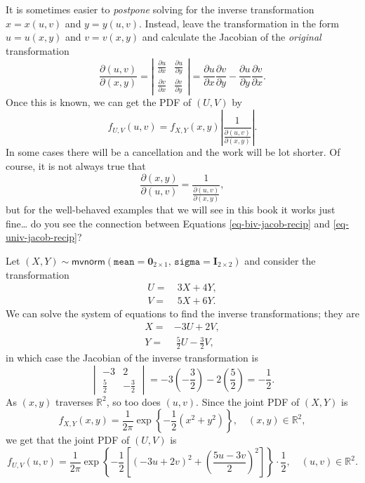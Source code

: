 \begin{rem}
It is sometimes easier to \emph{postpone} solving for the inverse
transformation \(x=x(u,v)\) and \(y=y(u,v)\). Instead, leave the
transformation in the form \(u=u(x,y)\) and \(v=v(x,y)\) and calculate
the Jacobian of the \emph{original} transformation
\begin{equation}
\frac{\partial(u,v)}{\partial(x,y)}=\left|\begin{array}{cc}
\frac{\partial u}{\partial x} & \frac{\partial u}{\partial y}\\
\frac{\partial v}{\partial x} & \frac{\partial v}{\partial y}\end{array}\right|=\frac{\partial u}{\partial x}\frac{\partial v}{\partial y}-\frac{\partial u}{\partial y}\frac{\partial v}{\partial x}.
\end{equation}
Once this is known, we can get the PDF of \((U,V)\) by
\begin{equation}
f_{U,V}(u,v)=f_{X,Y}(x,y)\left|\frac{1}{\frac{\partial(u,v)}{\partial(x,y)}}\right|.
\end{equation}
In some cases there will be a cancellation and the work will be lot
shorter. Of course, it is not always true that
\begin{equation}
\label{eq-biv-jacob-recip}
\frac{\partial(x,y)}{\partial(u,v)}=\frac{1}{\frac{\partial(u,v)}{\partial(x,y)}},
\end{equation}
but for the well-behaved examples that we will see in this book it
works just fine\ldots{} do you see the connection between Equations
\eqref{eq-biv-jacob-recip} and \eqref{eq-univ-jacob-recip}?
\end{rem}



Let
\((X,Y)\sim\mathsf{mvnorm}(\mathtt{mean}=\mathbf{0}_{2\times1},\,\mathtt{sigma}=\mathbf{I}_{2\times2})\)
and consider the transformation
\begin{align*}
U= & \ 3X+4Y,\\
V= & \ 5X+6Y.
\end{align*}
We can solve the system of equations to find the inverse
transformations; they are
\begin{align*}
X= & -3U+2V,\\
Y= & \ \frac{5}{2}U-\frac{3}{2}V,
\end{align*}
in which case the Jacobian of the inverse transformation is
\[ \begin{vmatrix} -3 & 2\\ \frac{5}{2} & -\frac{3}{2} \end{vmatrix} = -3\left(-\frac{3}{2}\right)-2\left(\frac{5}{2}\right) = -\frac{1}{2}.\]
As \((x,y)\) traverses \(\mathbb{R}^{2}\), so too does \((u,v)\). Since the joint PDF of \((X,Y)\) is
\[
f_{X,Y}(x,y)=\frac{1}{2\pi}\exp\left\{ -\frac{1}{2}\left(x^{2}+y^{2}\right)\right\} ,\quad (x,y)\in\mathbb{R}^{2},
\]
we get that the joint PDF of \((U,V)\) is
\begin{equation}
\label{eq-biv-norm-hidden}
f_{U,V}(u,v)=\frac{1}{2\pi}\exp\left\{ -\frac{1}{2}\left[\left(-3u+2v\right)^{2}+\left(\frac{5u-3v}{2}\right)^{2}\right]\right\} \cdot\frac{1}{2},\quad (u,v)\in\mathbb{R}^{2}.
\end{equation}


